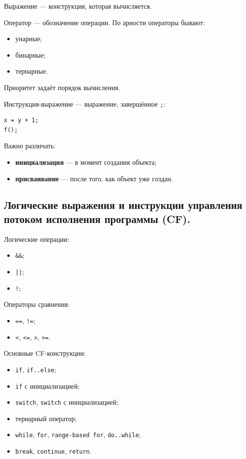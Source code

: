 Выражение --- конструкция, которая вычисляется.

Оператор --- обозначение операции. По арности операторы бывают:
\begin{itemize}
    \item унарные;
    \item бинарные;
    \item тернарные.
\end{itemize}

Приоритет задаёт порядок вычисления.

Инструкция-выражение --- выражение, завершённое \texttt{;}:
\begin{verbatim}
x = y + 1;
f();
\end{verbatim}

Важно различать:
\begin{itemize}
    \item \textbf{инициализация} --- в момент создания объекта;
    \item \textbf{присваивание} --- после того, как объект уже создан.
\end{itemize}


\subsection{Логические выражения и инструкции управления потоком исполнения программы (CF).}

Логические операции:
\begin{itemize}
    \item \texttt{\&\&};
    \item \texttt{||};
    \item \texttt{!};
\end{itemize}

Операторы сравнения:
\begin{itemize}
    \item \texttt{==}, \texttt{!=};
    \item \texttt{<}, \texttt{<=}, \texttt{>}, \texttt{>=}.
\end{itemize}

Основные CF-конструкции:
\begin{itemize}
    \item \texttt{if}, \texttt{if..else};
    \item \texttt{if} с инициализацией;
    \item \texttt{switch}, \texttt{switch} с инициализацией;
    \item тернарный оператор;
    \item \texttt{while}, \texttt{for}, \texttt{range-based for}, \texttt{do..while};
    \item \texttt{break}, \texttt{continue}, \texttt{return}.
\end{itemize}


